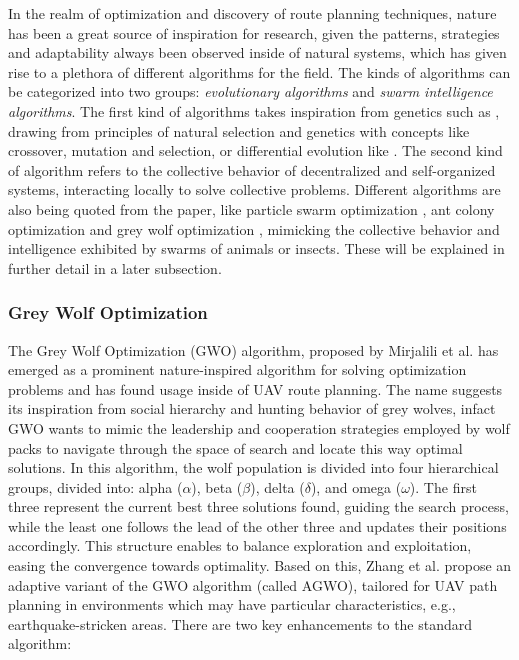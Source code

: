 \documentclass[conference]{IEEEtran}
\begin{document}
In the realm of optimization and discovery of route planning techniques, nature has been a great source of inspiration for research, given the patterns, strategies and adaptability always been observed inside of natural systems, which has given rise to a plethora of different algorithms for the field. The kinds of algorithms can be categorized into two groups: \textit{evolutionary algorithms} and \textit{swarm intelligence algorithms}. The first kind of algorithms takes inspiration from genetics such as \cite{ga}, drawing from principles of natural selection and genetics with concepts like crossover, mutation and selection, or differential evolution like \cite{de}. The second kind of algorithm refers to the collective behavior of decentralized and self-organized systems, interacting locally to solve collective problems. Different algorithms are also being quoted from the paper, like particle swarm optimization \cite{pso}, ant colony optimization \cite{aco} and grey wolf optimization \cite{gwo}, mimicking the collective behavior and intelligence exhibited by swarms of animals or insects. These will be explained in further detail in a later subsection. \\

\subsubsection{Grey Wolf Optimization}

The Grey Wolf Optimization (GWO) algorithm, proposed by Mirjalili et al. \cite{gwo} has emerged as a prominent nature-inspired algorithm for solving optimization problems and has found usage inside of UAV route planning. The name suggests its inspiration from social hierarchy and hunting behavior of grey wolves, infact GWO wants to mimic the leadership and cooperation strategies employed by wolf packs to navigate through the space of search and locate this way optimal solutions. In this algorithm, the wolf population is divided into four hierarchical groups, divided into: alpha ($\alpha$),  beta ($\beta$), delta ($\delta$), and omega ($\omega$). The first three represent the current best three solutions found, guiding the search process, while the least one follows the lead of the other three and updates their positions accordingly. This structure enables to balance exploration and exploitation, easing the convergence towards optimality. Based on this, Zhang et al. \cite{paper4} propose an adaptive variant of the GWO algorithm (called AGWO), tailored for UAV path planning in environments which may have particular characteristics, e.g., earthquake-stricken areas. There are two key enhancements to the standard algorithm:
\end{document}
